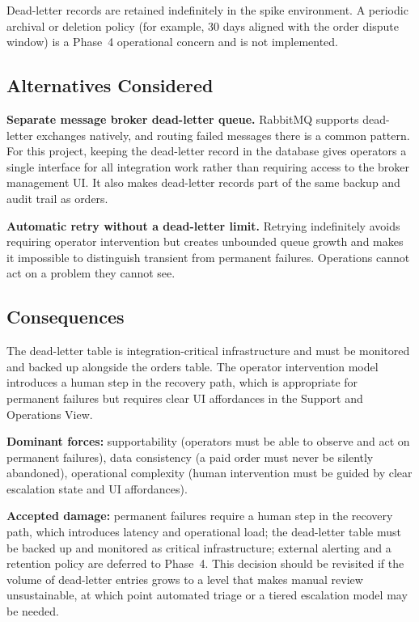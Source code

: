 Dead-letter records are retained indefinitely in the spike environment. A periodic archival
or deletion policy (for example, 30 days aligned with the order dispute window) is a Phase~4
operational concern and is not implemented.

\subsection{Alternatives Considered}

\textbf{Separate message broker dead-letter queue.} RabbitMQ supports dead-letter exchanges
natively, and routing failed messages there is a common pattern. For this project, keeping the
dead-letter record in the database gives operators a single interface for all integration work
rather than requiring access to the broker management UI. It also makes dead-letter records
part of the same backup and audit trail as orders.

\textbf{Automatic retry without a dead-letter limit.} Retrying indefinitely avoids requiring
operator intervention but creates unbounded queue growth and makes it impossible to distinguish
transient from permanent failures. Operations cannot act on a problem they cannot see.

\subsection{Consequences}

The dead-letter table is integration-critical infrastructure and must be monitored and backed
up alongside the orders table. The operator intervention model introduces a human step in the
recovery path, which is appropriate for permanent failures but requires clear UI affordances
in the Support and Operations View.

\textbf{Dominant forces:} supportability (operators must be able to observe and act on
permanent failures), data consistency (a paid order must never be silently abandoned),
operational complexity (human intervention must be guided by clear escalation state and
UI affordances).

\textbf{Accepted damage:} permanent failures require a human step in the recovery path, which
introduces latency and operational load; the dead-letter table must be backed up and monitored
as critical infrastructure; external alerting and a retention policy are deferred to Phase~4.
This decision should be revisited if the volume of dead-letter entries grows to a level that
makes manual review unsustainable, at which point automated triage or a tiered escalation
model may be needed.
